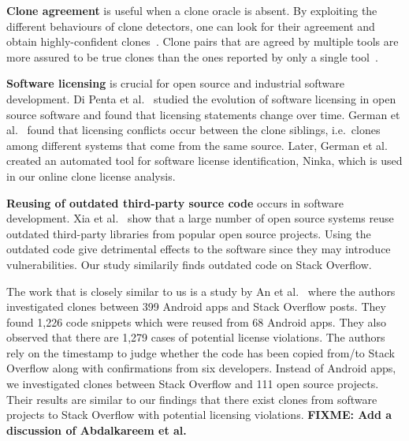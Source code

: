 \documentclass[10pt,journal,compsoc]{IEEEtran}
\newcommand\FIXME[1]{{\color{red}\textbf{FIXME: #1}}}
\begin{document}
\textbf{Clone agreement} is useful when a clone oracle is
absent. %
By exploiting the different behaviours of clone detectors,
one can look for their agreement and obtain
highly-confident clones~\cite{Bellon2007,Wang2013}. %
Clone pairs that are agreed by multiple tools are more assured to be true
clones than the ones reported by only a single
tool~\cite{Wang2013,cr2016ssbse,Funaro2010}. 

\textbf{Software licensing} is crucial for open source and 
industrial software development. Di Penta et al.~\cite{DiPenta2010}
studied the evolution of software licensing in open source 
software and found that licensing statements change over 
time. German et al.~\cite{German2009} found that licensing 
conflicts occur between the clone siblings, i.e.~clones among 
different systems that come from the same source. Later, 
German et al.~\cite{German2010} created an automated tool 
for software license identification, Ninka, which is used
in our online clone license analysis. 

\textbf{Reusing of outdated third-party source code} occurs 
in software development. Xia et al.~\cite{Xia2014} show that 
a large number of open source systems reuse outdated third-party 
libraries from popular open source projects. Using the outdated 
code give detrimental effects to the software since they may 
introduce vulnerabilities. Our study similarily finds
outdated code on Stack Overflow.

The work that is closely similar to us is a study by 
An et al.~\cite{An2017} where the authors investigated 
clones between 399 Android apps and Stack Overflow posts. 
They found 1,226 code snippets which were reused from 68 Android apps. 
They also observed that there are 1,279 cases of potential 
license violations. The authors rely on the timestamp to 
judge whether the code has been copied from/to Stack Overflow 
along with confirmations from six developers. Instead of Android apps, 
we investigated clones between Stack Overflow and 111 open 
source projects. Their results are similar to our findings that 
there exist clones from software projects to Stack Overflow with 
potential licensing violations. 
\FIXME{Add a discussion of Abdalkareem et al.~\cite{Abdalkareem2017}}
\end{document}
